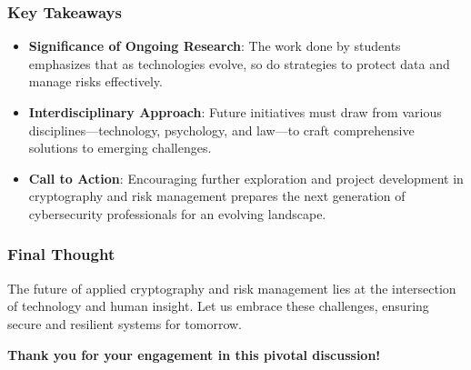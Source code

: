 \documentclass{beamer}
\begin{document}
\begin{frame}[fragile]
    \frametitle{Key Takeaways}
    
    \begin{itemize}
        \item \textbf{Significance of Ongoing Research}: 
        The work done by students emphasizes that as technologies evolve, so do strategies to protect data and manage risks effectively.
        
        \item \textbf{Interdisciplinary Approach}: 
        Future initiatives must draw from various disciplines—technology, psychology, and law—to craft comprehensive solutions to emerging challenges.
        
        \item \textbf{Call to Action}: 
        Encouraging further exploration and project development in cryptography and risk management prepares the next generation of cybersecurity professionals for an evolving landscape.
    \end{itemize}
\end{frame}

\begin{frame}[fragile]
    \frametitle{Final Thought}
    The future of applied cryptography and risk management lies at the intersection of technology and human insight. 
    Let us embrace these challenges, ensuring secure and resilient systems for tomorrow.
    
    \textbf{Thank you for your engagement in this pivotal discussion!}
\end{frame}
\end{document}
